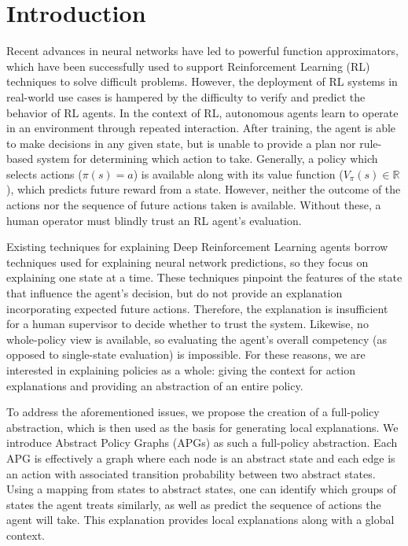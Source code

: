 \documentclass[letterpaper]{article} %
\begin{document}
\section{Introduction}
Recent advances in neural networks have led to powerful function approximators, which have been successfully used to support Reinforcement Learning (RL) techniques to solve difficult problems.
However, the deployment of RL systems in real-world use cases is hampered by the difficulty to verify and predict the behavior of RL agents. 
In the context of RL, autonomous agents learn to operate in an environment through repeated interaction. 
After training, the agent is able to make decisions in any given state, but is unable to provide a plan nor rule-based system for determining which action to take. 
Generally, a policy  which selects actions ($\pi(s) = a$) is available along with its value function ($V_{\pi}(s) \in \mathbb{R}$), which predicts future reward from a state. 
However, neither the outcome of the actions nor the sequence of future actions taken is available. 
Without these, a human operator must blindly trust an RL agent's evaluation. 

Existing techniques for explaining Deep Reinforcement Learning agents borrow techniques used for explaining neural network predictions, so they focus on explaining one state at a time. 
These techniques pinpoint the features of the state that influence the agent's decision, but do not provide an explanation incorporating expected future actions.
Therefore, the explanation is insufficient for a human supervisor to decide whether to trust the system. 
Likewise, no whole-policy view is available, so evaluating the agent's overall competency (as opposed to single-state evaluation) is impossible. 
For these reasons, we are interested in explaining policies as a whole: giving the context for action explanations and providing an abstraction of an entire policy. 

To address the aforementioned issues, we propose the creation of a full-policy abstraction, which is then used as the basis for generating local explanations.
We introduce Abstract Policy Graphs (APGs) as such a full-policy abstraction. 
Each APG is effectively a graph where each node is an abstract state and each edge is an action with associated transition probability between two abstract states.
Using a mapping from states to abstract states, one can identify which groups of states the agent treats similarly, as well as predict the sequence of actions the agent will take. 
This explanation provides local explanations along with a global context. 
\end{document}
